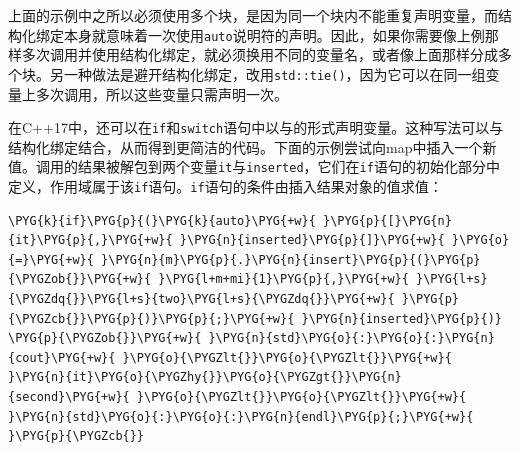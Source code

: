 
上面的示例中之所以必须使用多个块，是因为同一个块内不能重复声明变量，而结构化绑定本身就意味着一次使用\texttt{auto}说明符的声明。因此，如果你需要像上例那样多次调用并使用结构化绑定，就必须换用不同的变量名，或者像上面那样分成多个块。另一种做法是避开结构化绑定，改用\texttt{std::\allowbreak{}tie()}，因为它可以在同一组变量上多次调用，所以这些变量只需声明一次。



在C++17中，还可以在\texttt{if}和\texttt{switch}语句中以与的形式声明变量。这种写法可以与结构化绑定结合，从而得到更简洁的代码。下面的示例尝试向map中插入一个新值。调用的结果被解包到两个变量\texttt{it}与\texttt{inserted}，它们在\texttt{if}语句的初始化部分中定义，作用域属于该\texttt{if}语句。\texttt{if}语句的条件由插入结果对象的值求值：



\begin{codeblockbg}
\begin{Verbatim}[commandchars=\\\{\},breaklines=true,breakanywhere=true,fontsize=\codefont,xleftmargin=17bp]
\PYG{k}{if}\PYG{p}{(}\PYG{k}{auto}\PYG{+w}{ }\PYG{p}{[}\PYG{n}{it}\PYG{p}{,}\PYG{+w}{ }\PYG{n}{inserted}\PYG{p}{]}\PYG{+w}{ }\PYG{o}{=}\PYG{+w}{ }\PYG{n}{m}\PYG{p}{.}\PYG{n}{insert}\PYG{p}{(}\PYG{p}{\PYGZob{}}\PYG{+w}{ }\PYG{l+m+mi}{1}\PYG{p}{,}\PYG{+w}{ }\PYG{l+s}{\PYGZdq{}}\PYG{l+s}{two}\PYG{l+s}{\PYGZdq{}}\PYG{+w}{ }\PYG{p}{\PYGZcb{}}\PYG{p}{)}\PYG{p}{;}\PYG{+w}{ }\PYG{n}{inserted}\PYG{p}{)}
\PYG{p}{\PYGZob{}}\PYG{+w}{ }\PYG{n}{std}\PYG{o}{:}\PYG{o}{:}\PYG{n}{cout}\PYG{+w}{ }\PYG{o}{\PYGZlt{}}\PYG{o}{\PYGZlt{}}\PYG{+w}{ }\PYG{n}{it}\PYG{o}{\PYGZhy{}}\PYG{o}{\PYGZgt{}}\PYG{n}{second}\PYG{+w}{ }\PYG{o}{\PYGZlt{}}\PYG{o}{\PYGZlt{}}\PYG{+w}{ }\PYG{n}{std}\PYG{o}{:}\PYG{o}{:}\PYG{n}{endl}\PYG{p}{;}\PYG{+w}{ }\PYG{p}{\PYGZcb{}}
\end{Verbatim}
\end{codeblockbg}
